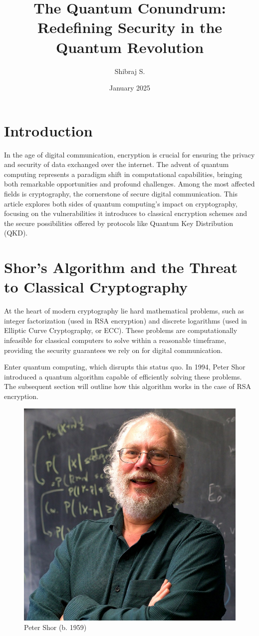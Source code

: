 \documentclass{article}
\title{The Quantum Conundrum: Redefining Security in the Quantum Revolution}
\author{Shibraj S.}
\date{January 2025}
\begin{document}
\maketitle

\section*{Introduction}

In the age of digital communication, encryption is crucial for ensuring the privacy and security of data exchanged over the internet. The advent of quantum computing represents a paradigm shift in computational capabilities, bringing both remarkable opportunities and profound challenges. Among the most affected fields is cryptography, the cornerstone of secure digital communication. This article explores both sides of quantum computing's impact on cryptography, focusing on the vulnerabilities it introduces to classical encryption schemes and the secure possibilities offered by protocols like Quantum Key Distribution (QKD).

\section*{Shor's Algorithm and the Threat to Classical Cryptography}

At the heart of modern cryptography lie hard mathematical problems, such as integer factorization (used in RSA encryption) and discrete logarithms (used in Elliptic Curve Cryptography, or ECC). These problems are computationally infeasible for classical computers to solve within a reasonable timeframe, providing the security guarantees we rely on for digital communication.

Enter quantum computing, which disrupts this status quo. In 1994, Peter Shor introduced a quantum algorithm capable of efficiently solving these problems. The subsequent section will outline how this algorithm works in the case of RSA encryption.
\begin{figure}[h]
    \centering
    \includegraphics[width = 7.00cm\textwidth]{shor.jpg}
     \caption*{Peter Shor (b. 1959)}
\end{figure}
\end{document}
